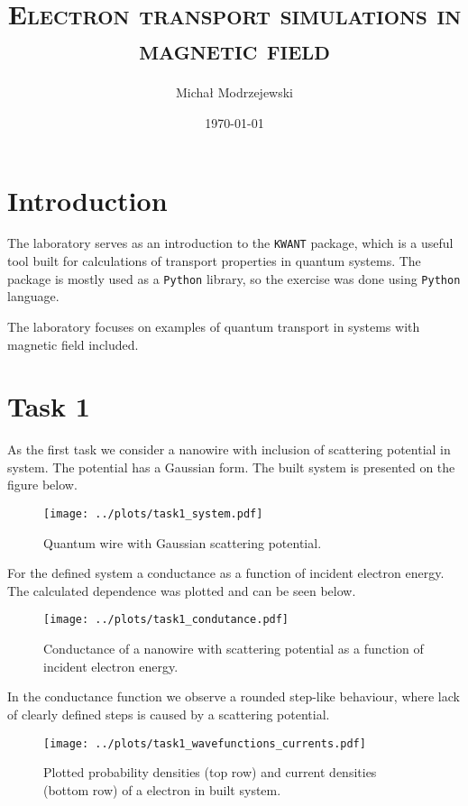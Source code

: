 \documentclass[12pt,a4]{article}
\title{\textsc{Electron transport simulations in magnetic field}}
\author{Michał Modrzejewski}
\date{\today}
\begin{document}
	
\maketitle

\section*{Introduction}

The laboratory serves as an introduction to the \texttt{KWANT} package, which is a useful tool built for calculations of transport properties in quantum systems. The package is mostly used as
a \texttt{Python} library, so the exercise was done using \texttt{Python} language. 

The laboratory focuses on examples of quantum transport in systems with magnetic field included.

\section*{Task 1}

As the first task we consider a nanowire with inclusion of scattering potential in system. The potential has a Gaussian form. The built system is presented on the figure below.

\begin{figure}[H]
	\texttt{[image: ../plots/task1\_system.pdf]}
	\caption{Quantum wire with Gaussian scattering potential.}
\end{figure}

For the defined system a conductance as a function of incident electron energy. The calculated dependence was plotted and can be seen below.

\begin{figure}[H]
	\texttt{[image: ../plots/task1\_condutance.pdf]}
	\caption{Conductance of a nanowire with scattering potential as a function of incident electron energy.}
\end{figure}

In the conductance function we observe a rounded step-like behaviour, where lack of clearly defined steps is caused by a scattering potential.

\begin{figure}[H]
	\texttt{[image: ../plots/task1\_wavefunctions\_currents.pdf]}
	\caption{Plotted probability densities (top row) and current densities (bottom row) of a electron in built system.}
\end{figure}
\end{document}
